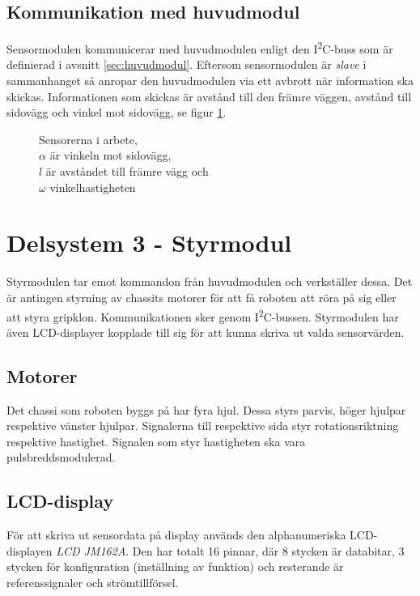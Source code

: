 \documentclass[11pt]{article}
\begin{document}
\begin{flushleft}
\subsection{Kommunikation med huvudmodul}
Sensormodulen kommunicerar med huvudmodulen enligt den I\textsuperscript{2}C-buss som är definierad i avsnitt \ref{sec:huvudmodul}. Eftersom sensormodulen är \emph{slave} i sammanhanget så anropar den huvudmodulen via ett avbrott när information ska skickas. Informationen som skickas är avstånd till den främre väggen, avstånd till sidovägg och vinkel mot sidovägg, se figur \ref{measurements}. 

\begin{figure}[htbp]
\centering

\noindent\resizebox{.5\textwidth}{!}{
	}
	\captionsetup{justification=centering}
	\caption{Sensorerna i arbete, \\ $\alpha$ är vinkeln mot sidovägg, \\ $l$ är avståndet till främre vägg och \\ $\omega$ vinkelhastigheten}
	\label{measurements}
\end{figure}
\pagebreak
\section{Delsystem 3 - Styrmodul}
Styrmodulen tar emot kommandon från huvudmodulen och verkställer dessa. Det är antingen styrning av chassits motorer för att få roboten att röra på sig eller att styra gripklon. Kommunikationen sker genom I\textsuperscript{2}C-bussen. Styrmodulen har även LCD-displayer kopplade till sig för att kunna skriva ut valda sensorvärden.
\subsection{Motorer}
Det chassi som roboten byggs på har fyra hjul. Dessa styrs parvis, höger hjulpar respektive vänster hjulpar. Signalerna till respektive sida styr rotationsriktning respektive hastighet. Signalen som styr hastigheten ska vara pulsbreddsmodulerad.
\subsection{LCD-display}
För att skriva ut sensordata på display används den alphanumeriska LCD-displayen \textit{LCD JM162A}. Den har totalt 16 pinnar, där 8 stycken är databitar, 3 stycken för konfiguration (inställning av funktion) och resterande är referenssignaler och strömtillförsel.


\end{flushleft}
\end{document}
